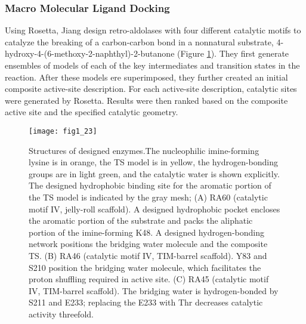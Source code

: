 \begin{refsection}
\subsubsection{Macro Molecular Ligand Docking}
Using Rosetta, Jiang  design retro-aldolases with four different
catalytic motifs to catalyze the breaking of a carbon-carbon bond in a
nonnatural substrate,
4-hydroxy-4-(6-methoxy-2-naphthyl)-2-butanone \cite{Jiang2008} (Figure
\ref{fig:rosetta-enzyme}). They first generate ensembles of models of each of
the key intermediates and transition states in the reaction. After these models
ere superimposed, they further created an initial composite active-site
description. For each active-site description, catalytic sites were generated by
Rosetta. Results were then ranked based on the composite active site and the
specified catalytic geometry.
\begin{figure}[htbp] \centering \texttt{[image: fig1\_23]}
    \caption[Structures of designed enzymes.The nucleophilic imine-forming
        lysine is in orange, the TS model is in yellow, the hydrogen-bonding
        groups are in light green, and the catalytic water is shown explicitly.
        The designed hydrophobic binding site for the aromatic portion of the
        TS model is indicated by the gray mesh; (A) RA60 (catalytic motif IV,
        jelly-roll scaffold). A designed hydrophobic pocket encloses the
        aromatic portion of the substrate and packs the aliphatic portion of
        the imine-forming K48. A designed hydrogen-bonding network positions
        the bridging water molecule and the composite TS. (B) RA46 (catalytic
        motif IV, TIM-barrel scaffold). Y83 and S210 position the bridging
        water molecule, which facilitates the proton shuffling required in
        active site. (C) RA45 (catalytic motif IV, TIM-barrel scaffold). The
        bridging water is hydrogen-bonded by S211 and E233; replacing the
    E233 with Thr decreases catalytic activity threefold.] {Structures of
        designed enzymes.The nucleophilic imine-forming lysine is in orange,
        the TS model is in yellow, the hydrogen-bonding groups are in light
        green, and the catalytic water is shown explicitly. The designed
        hydrophobic binding site for the aromatic portion of the TS model is
        indicated by the gray mesh; (A) RA60 (catalytic motif IV, jelly-roll
        scaffold). A designed hydrophobic pocket encloses the aromatic portion
        of the substrate and packs the aliphatic portion of the imine-forming
        K48. A designed hydrogen-bonding network positions the bridging water
        molecule and the composite TS. (B) RA46 (catalytic motif IV, TIM-barrel
        scaffold). Y83 and S210 position the bridging water molecule, which
        facilitates the proton shuffling required in active site. (C) RA45
        (catalytic motif IV, TIM-barrel scaffold). The bridging water is
        hydrogen-bonded by S211 and E233; replacing the E233 with Thr
        decreases catalytic activity threefold\cite{Jiang2008}.} 
        \label{fig:rosetta-enzyme} 
\end{figure}


\end{refsection}
